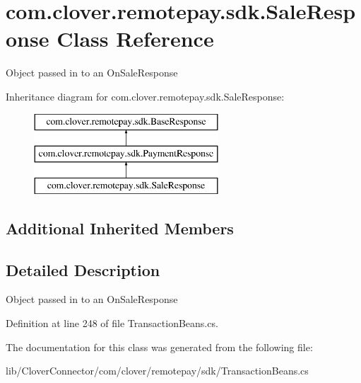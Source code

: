 \hypertarget{classcom_1_1clover_1_1remotepay_1_1sdk_1_1_sale_response}{}\section{com.\+clover.\+remotepay.\+sdk.\+Sale\+Response Class Reference}
\label{classcom_1_1clover_1_1remotepay_1_1sdk_1_1_sale_response}


Object passed in to an On\+Sale\+Response  


Inheritance diagram for com.\+clover.\+remotepay.\+sdk.\+Sale\+Response\+:\begin{figure}[H]
\begin{center}
\leavevmode
\includegraphics[height=3.000000cm]{classcom_1_1clover_1_1remotepay_1_1sdk_1_1_sale_response}
\end{center}
\end{figure}
\subsection*{Additional Inherited Members}


\subsection{Detailed Description}
Object passed in to an On\+Sale\+Response 



Definition at line 248 of file Transaction\+Beans.\+cs.



The documentation for this class was generated from the following file\+:\begin{DoxyCompactItemize}
\item 
lib/\+Clover\+Connector/com/clover/remotepay/sdk/Transaction\+Beans.\+cs\end{DoxyCompactItemize}
